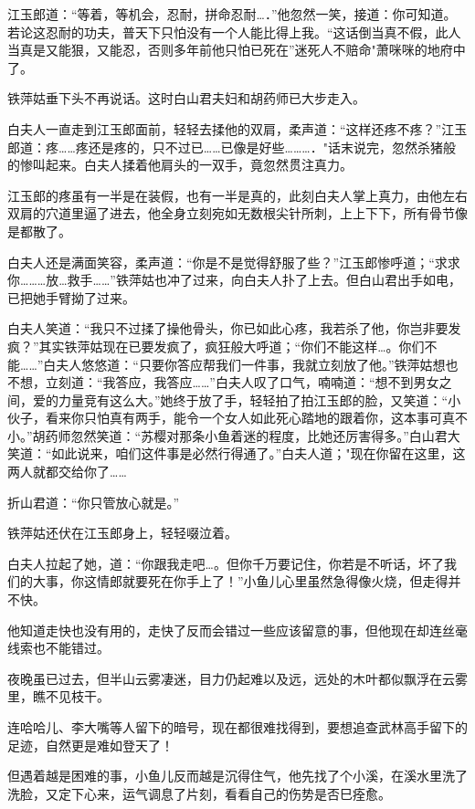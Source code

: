 \documentclass[12pt,oneside]{book}
\begin{document}
江玉郎道：``等着，等机会，忍耐，拼命忍耐\ldots．''他忽然一笑，接道：你可知道。若论这忍耐的功夫，普天下只怕没有一个人能比得上我。``这话倒当真不假，此人当真是又能狠，又能忍，否则多年前他只怕已死在''迷死人不赔命"萧咪咪的地府中了。

铁萍姑垂下头不再说话。这时白山君夫妇和胡药师已大步走入。

白夫人一直走到江玉郎面前，轻轻去揉他的双肩，柔声道：``这样还疼不疼？''江玉郎道：疼\ldots\ldots 疼还是疼的，只不过已\ldots\ldots 已像是好些\ldots\ldots\ldots．"话末说完，忽然杀猪般的惨叫起来。白夫人揉着他肩头的一双手，竟忽然贯注真力。

江玉郎的疼虽有一半是在装假，也有一半是真的，此刻白夫人掌上真力，由他左右双肩的穴道里逼了进去，他全身立刻宛如无数根尖针所刺，上上下下，所有骨节像是都散了。

白夫人还是满面笑容，柔声道：``你是不是觉得舒服了些？''江玉郎惨呼道；``求求你\ldots\ldots\ldots 放\ldots 救手\ldots\ldots{}''铁萍姑也冲了过来，向白夫人扑了上去。但白山君出手如电，已把她手臂拗了过来。

白夫人笑道：``我只不过揉了操他骨头，你已如此心疼，我若杀了他，你岂非要发疯？''其实铁萍姑现在已要发疯了，疯狂般大呼道；``你们不能这样\ldots。你们不能\ldots\ldots{}''白夫人悠悠道：``只要你答应帮我们一件事，我就立刻放了他。''铁萍姑想也不想，立刻道：``我答应，我答应\ldots\ldots{}''白夫人叹了口气，喃喃道：``想不到男女之间，爱的力量竞有这么大。''她终于放了手，轻轻拍了拍江玉郎的脸，又笑道：``小伙子，看来你只怕真有两手，能令一个女人如此死心踏地的跟着你，这本事可真不小。''胡药师忽然笑道：``苏樱对那条小鱼着迷的程度，比她还厉害得多。''白山君大笑道：``如此说来，咱们这件事是必然行得通了。''白夫人道；"现在你留在这里，这两人就都交给你了\ldots\ldots{}

折山君道：``你只管放心就是。''

铁萍姑还伏在江玉郎身上，轻轻啜泣着。

白夫人拉起了她，道：``你跟我走吧\ldots。但你千万要记住，你若是不听话，坏了我们的大事，你这情郎就要死在你手上了！''小鱼儿心里虽然急得像火烧，但走得并不快。

他知道走快也没有用的，走快了反而会错过一些应该留意的事，但他现在却连丝毫线索也不能错过。

夜晚虽已过去，但半山云雾凄迷，目力仍起难以及远，远处的木叶都似飘浮在云雾里，瞧不见枝干。

连哈哈儿、李大嘴等人留下的暗号，现在都很难找得到，要想追查武林高手留下的足迹，自然更是难如登天了！

但遇着越是困难的事，小鱼儿反而越是沉得住气，他先找了个小溪，在溪水里洗了洗脸，又定下心来，运气调息了片刻，看看自己的伤势是否巳痊愈。
\end{document}
